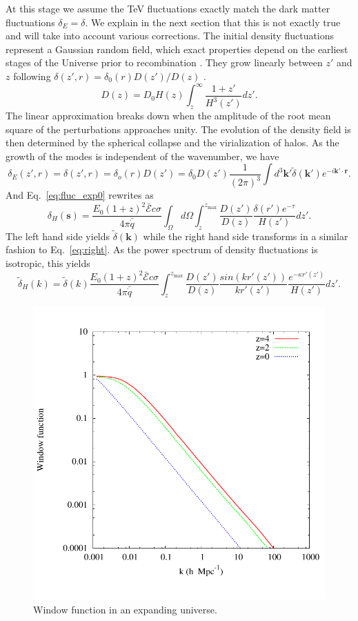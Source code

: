 \documentclass[twocolumns]{emulateapj}
\begin{document}
At this stage we assume the TeV fluctuations exactly match the dark matter fluctuations $\delta_E=\delta$. We explain in the next section that this is not exactly true and will take into account various corrections. The initial density fluctuations represent a Gaussian random field, which exact properties depend on the earliest stages of the Universe prior to recombination \citep{1986ApJ...304...15B,Peebles}. They grow linearly between $z'$ and $z$ following $\delta(z',r)=\delta_0(r)D(z')/D(z)$ \citep{ 1977MNRAS.179..351H}.
\begin{equation}
\label{eq:growth_1}
D(z)=D_0H(z)\int_z^{\infty}\frac{1+z'}{H^3(z')}dz'.
\end{equation}
The linear approximation breaks down when the amplitude of the root mean square of the perturbations approaches unity. The evolution of the density field is then determined by the spherical collapse \citep{1972ApJ...176....1G} and the virialization of halos. As the growth of the modes is independent of the wavenumber, we have
\begin{equation}
\label{eq:FT_delta}
\delta_E(z',r)=\delta(z',r)=\delta_o(r)D(z')=\delta_0D(z')\frac{1}{(2\pi)^3}\int d^3\mathbf{k'} \tilde{\delta}(\mathbf{k'}) e^{-i\mathbf{k'}\cdot\mathbf{r}}.
\end{equation}
And Eq.~\eqref{eq:fluc_exp0} rewrites as
\begin{equation}
\label{eq:heat_fluc_exp0}
\delta_H(\mathbf{s})=\frac{ E_0(1+z)^2 \bar{\mathcal{E}} c\sigma}{4\pi\bar{\dot{q}}} \int_{\Omega}d\Omega\int_z^{z_{\mathrm{max}}} \frac{D(z')}{D(z)} \frac{\delta(r') e^{-\tau}}{H(z')}dz'.
\end{equation}
The left hand side yields $\tilde{\delta}(\mathbf{k})$ while the right hand side transforms in a similar fashion to Eq.~\eqref{eq:right}. As the power spectrum of density fluctuations is isotropic, this yields
\begin{equation}
\label{eq:heat_fluc_exp1}
\tilde{\delta}_H(k)=\tilde{\delta}(k) \frac{E_0(1+z)^2\bar{\mathcal{E}}c\sigma}{4\pi\bar{\dot{q}}} \int_z^{z_{\mathrm{max}}} \frac{D(z')}{D(z)}\frac{sin(kr'(z'))}{kr'(z')} \frac{e^{-\kappa r'(z')}} {H(z')} dz'.
\end{equation}
\begin{figure}[h]
\centering
\includegraphics[width = .45\textwidth ]{window_nobiases-eps-converted-to}
\caption{Window function in an expanding universe.}
\label{fig:window_nobiases}
\end{figure}
\end{document}
